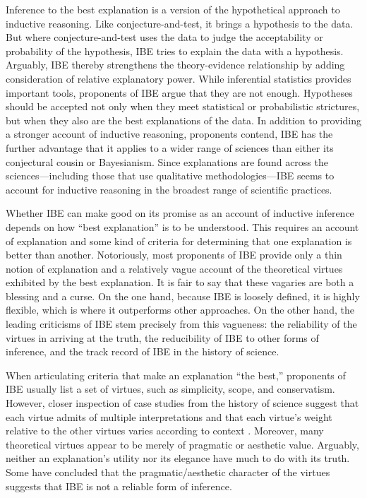 \documentclass{article}[11pt]
\begin{document}
Inference to the best explanation is a version of the hypothetical approach to inductive reasoning.  Like conjecture-and-test, it brings a hypothesis to the data.  But where conjecture-and-test uses the data to judge the acceptability or probability of the hypothesis, IBE tries to explain the data with a hypothesis.  Arguably, IBE thereby strengthens the theory-evidence relationship by adding consideration of relative explanatory power.  While inferential statistics provides important tools, proponents of IBE argue that they are not enough.  Hypotheses should be accepted not only when they  meet statistical or probabilistic strictures, but when they also are the best explanations of the data. In addition to providing a stronger account of inductive reasoning, proponents contend, IBE has the further advantage that it applies to a wider range of sciences than either its conjectural cousin or Bayesianism.  Since explanations are found across the sciences---including those that use qualitative methodologies---IBE seems to account for inductive reasoning in the broadest range of scientific practices.

Whether IBE can make good on its promise as an account of inductive inference depends on how ``best explanation'' is to be understood.  This requires an account of explanation and some kind of criteria for determining that one explanation is better than another.  Notoriously, most proponents of IBE provide only a thin notion of explanation and a relatively vague account of the theoretical virtues exhibited by the best explanation.  It is fair to say that these vagaries are both a blessing and a curse. On the one hand, because IBE is loosely defined, it is highly flexible, which is where it outperforms other approaches. On the other hand, the leading criticisms of IBE stem precisely from this vagueness: the reliability of the virtues in arriving at the truth, the reducibility of IBE to other forms of inference, and the track record of IBE in the history of science.

When articulating criteria that make an explanation ``the best,'' proponents of IBE usually list a set of virtues, such as simplicity, scope, and conservatism. However, closer inspection of case studies from the history of science suggest that each virtue admits of multiple interpretations and that each virtue's weight relative to the other virtues varies according to context \citep{Kuhn1977}. Moreover, many theoretical virtues appear to be merely of pragmatic or aesthetic value. Arguably, neither an explanation's utility nor its elegance have much to do with its truth. Some have concluded that the pragmatic/aesthetic character of the virtues suggests that IBE is not a reliable form of inference.
\end{document}
